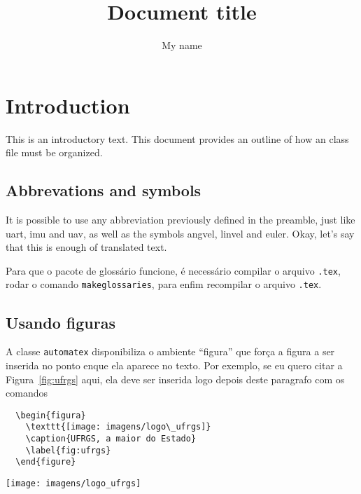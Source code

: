 \documentclass[ingles]{automatex}
\title{Document title}
\author{My name}
\begin{document}
\maketitle %

\section{Introduction}

This is an introductory text. This document provides an outline of how an \automatex{} class file must be organized.

\subsection{Abbrevations and symbols}

It is possible to use any abbreviation previously defined in the preamble, just like \gls{uart}, \gls{imu} and \gls{uav}, as well as the symbols \gls{angvel}, \gls{linvel} and \gls{euler}. Okay, let's say that this is enough of translated text.

Para que o pacote de glossário funcione, é necessário compilar o arquivo \verb+.tex+, rodar o comando \verb+makeglossaries+, para enfim recompilar o arquivo \verb+.tex+.

\subsection{Usando figuras}

A classe \verb+automatex+ disponibiliza o ambiente ``figura'' que força a figura a ser inserida no ponto enque ela aparece no texto. Por exemplo, se eu quero citar a Figura~\ref{fig:ufrgs} aqui, ela deve ser inserida logo depois deste paragrafo com os comandos
\begin{verbatim}
  \begin{figura}
    \texttt{[image: imagens/logo\_ufrgs]}
    \caption{UFRGS, a maior do Estado}
    \label{fig:ufrgs}
  \end{figure}
\end{verbatim}

\begin{figura}
  \texttt{[image: imagens/logo\_ufrgs]}
  \caption{UFRGS, a maior do Estado}
  \label{fig:ufrgs}
\end{figura}
\end{document}
